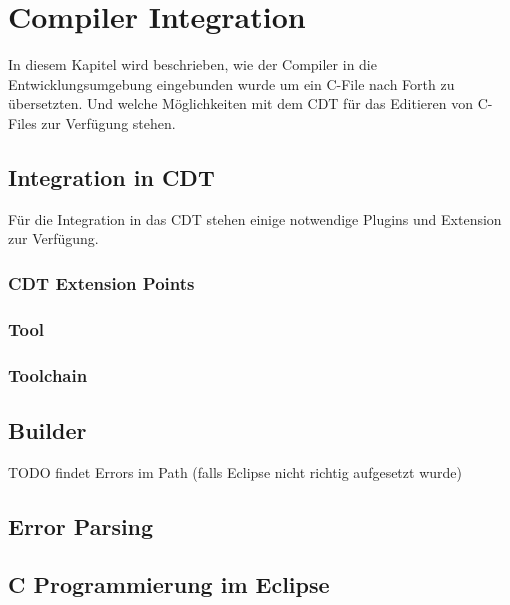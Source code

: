 \chapter{Compiler Integration}
\label{compilerintegration}

In diesem Kapitel wird beschrieben, wie der Compiler in die Entwicklungsumgebung eingebunden wurde um ein C-File nach Forth zu übersetzten. Und welche Möglichkeiten mit dem CDT für das Editieren von C-Files zur Verfügung stehen.

\section{Integration in CDT}

Für die Integration in das CDT stehen einige notwendige Plugins und Extension zur Verfügung. 

\subsection{CDT Extension Points}

\subsection{Tool}

\subsection{Toolchain}

\section{Builder}

TODO findet Errors im Path (falls Eclipse nicht richtig aufgesetzt wurde)

\section{Error Parsing}

\section{C Programmierung im Eclipse}


